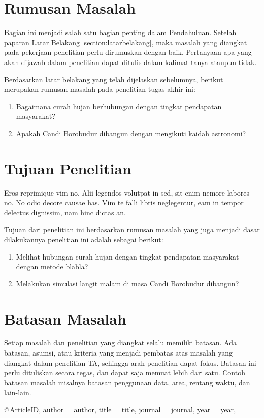 \section{Rumusan Masalah}
\noindent Bagian ini menjadi salah satu bagian penting dalam Pendahuluan. Setelah paparan Latar Belakang \ref{section:latarbelakang}, maka masalah yang diangkat pada pekerjaan penelitian perlu dirumuskan dengan baik. Pertanyaan apa yang akan dijawab dalam penelitian dapat ditulis dalam kalimat tanya ataupun tidak.

\noindent Berdasarkan latar belakang yang telah dijelaskan sebelumnya, berikut merupakan rumusan masalah pada penelitian tugas akhir ini:
\begin{enumerate}
    \item Bagaimana curah hujan berhubungan dengan tingkat pendapatan masyarakat?
    \item Apakah Candi Borobudur dibangun dengan mengikuti kaidah astronomi?
\end{enumerate}

\section{Tujuan Penelitian}
\noindent Eros reprimique vim no. Alii legendos volutpat in sed, sit enim nemore labores no. No odio decore causae has. Vim te falli libris neglegentur, eam in tempor delectus dignissim, nam hinc dictas an.

\noindent Tujuan dari penelitian ini berdasarkan rumusan masalah yang juga menjadi dasar dilakukannya penelitian ini adalah sebagai berikut:
\begin{enumerate}
    \item Melihat hubungan curah hujan dengan tingkat pendapatan masyarakat dengan metode blabla?
    \item Melakukan simulasi langit malam di masa Candi Borobudur dibangun?
\end{enumerate}

\section{Batasan Masalah}
\noindent Setiap masalah dan penelitian yang diangkat selalu memiliki batasan. Ada batasan, asumsi, atau kriteria yang menjadi pembatas atas masalah yang diangkat dalam penelitian TA, sehingga arah penelitian dapat fokus. Batasan ini perlu dituliskan secara tegas, dan dapat saja memuat lebih dari satu. Contoh batasan masalah misalnya batasan penggunaan data, area, rentang waktu, dan lain-lain.


@Article{ID,
	author = {author},
	title = {title},
	journal = {journal},
	year = {year},
}
